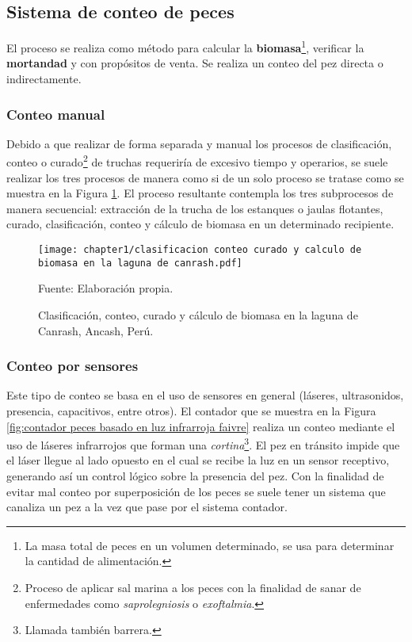 \subsection{Sistema de conteo de peces}

El proceso se realiza como método para calcular la \textbf{biomasa}\footnote{La masa total de peces en un volumen determinado, se usa para determinar la cantidad de alimentación.}, verificar la \textbf{mortandad} y con propósitos de venta. Se realiza un conteo del pez directa o indirectamente. 

\subsubsection{Conteo manual}

Debido a que realizar de forma separada y manual los procesos de clasificación, conteo o curado\footnote{Proceso de aplicar sal marina a los peces con la finalidad de sanar de enfermedades como \textit{saprolegniosis} o \textit{exoftalmia}.}  de truchas requeriría de excesivo tiempo y operarios, se suele realizar los tres procesos de manera como si de un solo proceso se tratase como se muestra en la Figura \ref{fig:clasificacion conteo curado y calculo de biomasa en la laguna de canrash}. El proceso resultante contempla los tres subprocesos de manera secuencial: extracción de la trucha de los estanques o jaulas flotantes, curado, clasificación, conteo y cálculo de biomasa en un determinado recipiente.\\

\begin{figure}[H]
	\centering
	\texttt{[image: chapter1/clasificacion conteo curado y calculo de biomasa en la laguna de canrash.pdf]}
	\caption{Clasificación, conteo, curado y cálculo de biomasa en la laguna de Canrash, Ancash, Perú.}
	Fuente: Elaboración propia.
	\label{fig:clasificacion conteo curado y calculo de biomasa en la laguna de canrash}
\end{figure}

\subsubsection{Conteo por sensores}

Este tipo de conteo se basa en el uso de sensores en general (láseres, ultrasonidos, presencia, capacitivos, entre otros).  El contador que se muestra en la Figura \ref{fig:contador peces basado en luz infrarroja faivre} realiza un conteo mediante el uso de láseres infrarrojos que forman una \textit{cortina}\footnote{Llamada también barrera.}. El pez en tránsito impide que el láser llegue al lado opuesto en el cual se recibe la luz en un sensor receptivo, generando así un control lógico sobre la presencia del pez. Con la finalidad de evitar mal conteo por superposición de los peces se suele tener un sistema que canaliza un pez a la vez que pase por el sistema contador.

